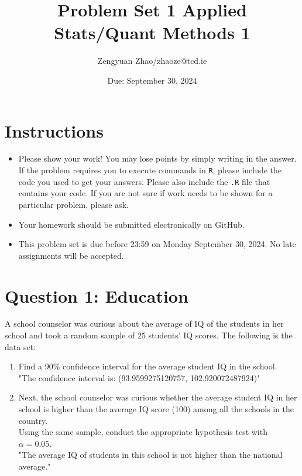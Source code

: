 \documentclass[12pt,letterpaper]{article}
\title{Problem Set 1  Applied Stats/Quant Methods 1}
\date{Due: September 30, 2024}
\author{Zengyuan Zhao/zhaoze@tcd.ie}
\begin{document}
	\maketitle
	
	\section*{Instructions}
	\begin{itemize}
	\item Please show your work! You may lose points by simply writing in the answer. If the problem requires you to execute commands in \texttt{R}, please include the code you used to get your answers. Please also include the \texttt{.R} file that contains your code. If you are not sure if work needs to be shown for a particular problem, please ask.
\item Your homework should be submitted electronically on GitHub.
\item This problem set is due before 23:59 on Monday September 30, 2024. No late assignments will be accepted.
	\end{itemize}
	
	\vspace{1cm}
	\section*{Question 1: Education}

A school counselor was curious about the average of IQ of the students in her school and took a random sample of 25 students' IQ scores. The following is the data set:\\
\vspace{.5cm}

  

\vspace{1cm}

\begin{enumerate}
	\item Find a 90\% confidence interval for the average student IQ in the school.\\
	  
"The confidence interval is: (93.9599275120757, 102.920072487924)"\\
	\item Next, the school counselor was curious  whether  the average student IQ in her school is higher than the average IQ score (100) among all the schools in the country.\\ 
	\noindent Using the same sample, conduct the appropriate hypothesis test with $\alpha=0.05$.\\
	
	"The average IQ of students in this school is not higher than the national average."\\
\end{enumerate}
\end{document}
